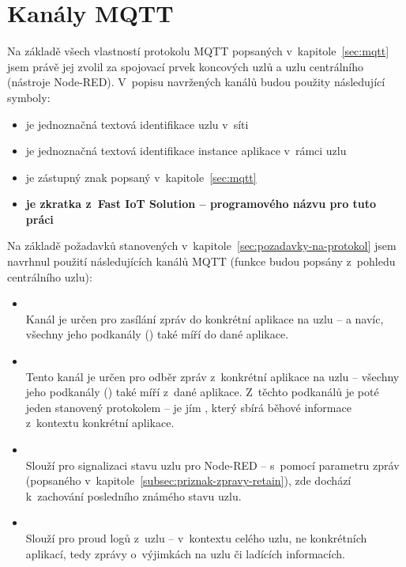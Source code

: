 \section{Kanály MQTT}\label{sec:mqtt-kanaly}
Na základě všech vlastností protokolu MQTT popsaných v~kapitole~\ref{sec:mqtt} jsem právě jej zvolil za spojovací
prvek koncových uzlů a uzlu centrálního (nástroje Node-RED).
V~popisu navržených kanálů budou použity následující symboly:
\begin{itemize}
    \item {} je jednoznačná textová identifikace uzlu v~síti
    \item {} je jednoznačná textová identifikace instance aplikace v~rámci uzlu
    \item \ic{\#} je zástupný znak popsaný v~kapitole~\ref{sec:mqtt}
    \item {} \textbf{je zkratka z~Fast IoT Solution -- programového názvu pro tuto práci}
\end{itemize}

Na základě požadavků stanovených v~kapitole~\ref{sec:pozadavky-na-protokol} jsem navrhnul použití následujících
kanálů MQTT (funkce budou popsány z~pohledu centrálního uzlu):

\begin{itemize}
    \item {} \\
    Kanál je určen pro zasílání zpráv do konkrétní aplikace na uzlu -- a navíc,
    všechny jeho podkanály () také míří do dané aplikace.

    \item {} \\
    Tento kanál je určen pro odběr zpráv z~konkrétní aplikace na uzlu --
    všechny jeho podkanály () také míří z~dané aplikace.
    Z~těchto podkanálů je poté jeden stanovený protokolem -- je jím , který sbírá běhové informace z~kontextu
    konkrétní aplikace.

    \item {} \\
    Slouží pro signalizaci stavu uzlu pro Node-RED -- s~pomocí parametru zpráv  (popsaného
    v~kapitole~\ref{subsec:priznak-zpravy-retain}), zde dochází k~zachování posledního známého stavu uzlu.

    \item {} \\
    Slouží pro proud logů z~uzlu -- v~kontextu celého uzlu, ne konkrétních aplikací, tedy zprávy o~výjimkách na uzlu
    či ladících informacích.
\end{itemize}

